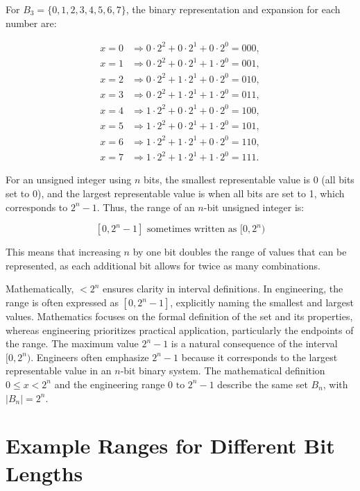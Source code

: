 For \( B_3 = \{0, 1, 2, 3, 4, 5, 6, 7\} \), the binary representation and expansion for each number are:

\[
\begin{aligned}
x = 0 & \Rightarrow 0 \cdot 2^2 + 0 \cdot 2^1 + 0 \cdot 2^0 = 000, \\
x = 1 & \Rightarrow 0 \cdot 2^2 + 0 \cdot 2^1 + 1 \cdot 2^0 = 001, \\
x = 2 & \Rightarrow 0 \cdot 2^2 + 1 \cdot 2^1 + 0 \cdot 2^0 = 010, \\
x = 3 & \Rightarrow 0 \cdot 2^2 + 1 \cdot 2^1 + 1 \cdot 2^0 = 011, \\
x = 4 & \Rightarrow 1 \cdot 2^2 + 0 \cdot 2^1 + 0 \cdot 2^0 = 100, \\
x = 5 & \Rightarrow 1 \cdot 2^2 + 0 \cdot 2^1 + 1 \cdot 2^0 = 101, \\
x = 6 & \Rightarrow 1 \cdot 2^2 + 1 \cdot 2^1 + 0 \cdot 2^0 = 110, \\
x = 7 & \Rightarrow 1 \cdot 2^2 + 1 \cdot 2^1 + 1 \cdot 2^0 = 111.
\end{aligned}
\]


For an unsigned integer using \( n \) bits, the smallest representable value is 0 (all bits set to 0), and the largest representable value is when all bits are set to 1, which corresponds to \( 2^n - 1 \). Thus, the range of an \( n \)-bit unsigned integer is:

\[
[0, 2^n - 1] \text{ sometimes written as } [0, 2^n)
\]

This means that increasing \( n \) by one bit doubles the range of values that can be represented, as each additional bit allows for twice as many combinations.

Mathematically, \( < 2^n \) ensures clarity in interval definitions. In engineering, the range is often expressed as \( [0, 2^n - 1] \), explicitly naming the smallest and largest values. Mathematics focuses on the formal definition of the set and its properties, whereas engineering prioritizes practical application, particularly the endpoints of the range. The maximum value \( 2^n - 1 \) is a natural consequence of the interval \( [0, 2^n) \). Engineers often emphasize \( 2^n - 1 \) because it corresponds to the largest representable value in an \( n \)-bit binary system. The mathematical definition \( 0 \leq x < 2^n \) and the engineering range \( 0 \text{ to } 2^n - 1 \) describe the same set \( B_n \), with \( |B_n| = 2^n \).

\section{Example Ranges for Different Bit Lengths}

